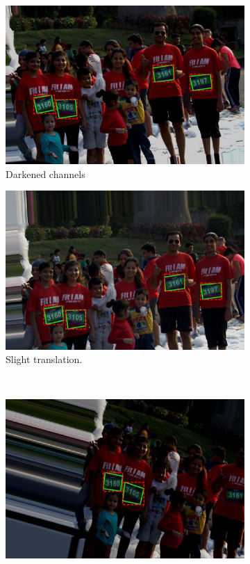 \begin{figure}[h!]
\begin{subfigure}[b]{0.475\textwidth}
    \includegraphics[width=\textwidth]{images/dataset/augmentation/neg_multiply}
    \caption{Darkened channels}
  \end{subfigure}
  \hspace{\fill}
  \begin{subfigure}[b]{0.475\textwidth}
    \includegraphics[width=\textwidth]{images/dataset/augmentation/offset}
    \caption{Slight translation.}
  \end{subfigure}
  \hspace{\fill} 
  \bigskip
  \\
  \hspace{\fill}
  \begin{subfigure}[b]{0.475\textwidth}
    \includegraphics[width=\textwidth]{images/dataset/augmentation/dark}

\end{subfigure}
\end{figure}
